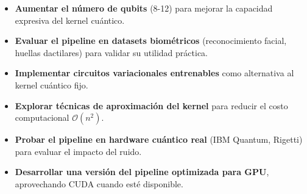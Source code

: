 \documentclass[conference]{IEEEtran}
\begin{document}
\begin{itemize}
    \item \textbf{Aumentar el número de qubits} (8-12) para mejorar la 
          capacidad expresiva del kernel cuántico.
    \item \textbf{Evaluar el pipeline en datasets biométricos} (reconocimiento 
          facial, huellas dactilares) para validar su utilidad práctica.
    \item \textbf{Implementar circuitos variacionales entrenables} como 
          alternativa al kernel cuántico fijo.
    \item \textbf{Explorar técnicas de aproximación del kernel} para reducir 
          el costo computacional $\mathcal{O}(n^2)$.
    \item \textbf{Probar el pipeline en hardware cuántico real} (IBM Quantum, 
          Rigetti) para evaluar el impacto del ruido.
    \item \textbf{Desarrollar una versión del pipeline optimizada para GPU}, 
          aprovechando CUDA cuando esté disponible.
\end{itemize}
\end{document}
